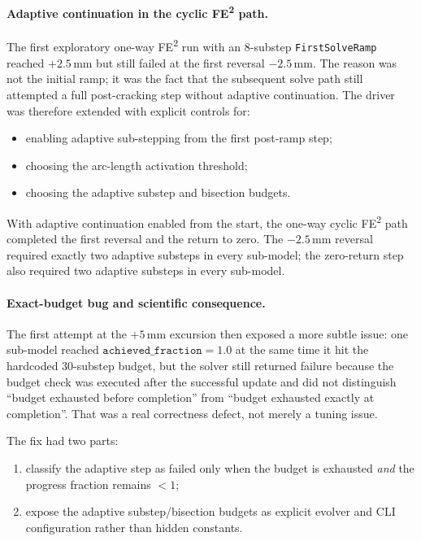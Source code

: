 \paragraph{Adaptive continuation in the cyclic FE\textsuperscript{2} path.}
The first exploratory one-way FE\textsuperscript{2} run with an
8-substep \texttt{FirstSolveRamp} reached \(+2.5\)\,mm but still failed at the
first reversal \(-2.5\)\,mm.  The reason was not the initial ramp; it was the
fact that the subsequent solve path still attempted a full post-cracking step
without adaptive continuation.  The driver was therefore extended with
explicit controls for:
\begin{itemize}
  \item enabling adaptive sub-stepping from the first post-ramp step;
  \item choosing the arc-length activation threshold;
  \item choosing the adaptive substep and bisection budgets.
\end{itemize}
With adaptive continuation enabled from the start, the one-way cyclic
FE\textsuperscript{2} path completed the first reversal and the return to zero.
The \(-2.5\)\,mm reversal required exactly two adaptive substeps in every
sub-model; the zero-return step also required two adaptive substeps in every
sub-model.

\paragraph{Exact-budget bug and scientific consequence.}
The first attempt at the \(+5\)\,mm excursion then exposed a more subtle issue:
one sub-model reached \(\texttt{achieved\_fraction}=1.0\) at the same time it
hit the hardcoded 30-substep budget, but the solver still returned failure
because the budget check was executed after the successful update and did not
distinguish ``budget exhausted before completion'' from ``budget exhausted
exactly at completion''.  That was a real correctness defect, not merely a
tuning issue.

The fix had two parts:
\begin{enumerate}
  \item classify the adaptive step as failed only when the budget is exhausted
    \emph{and} the progress fraction remains \(< 1\);
  \item expose the adaptive substep/bisection budgets as explicit evolver and
    CLI configuration rather than hidden constants.
\end{enumerate}


